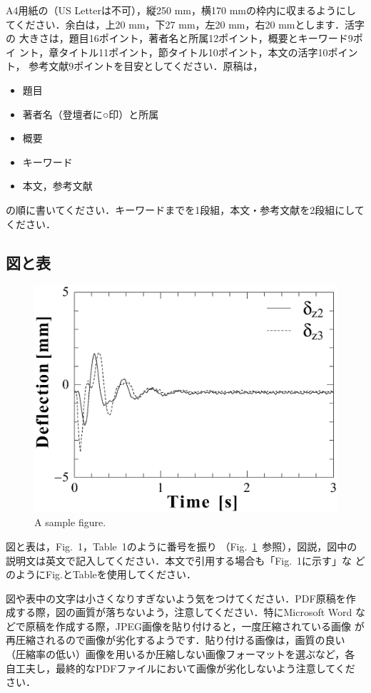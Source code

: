 \documentclass{jarticle}
\begin{document}
A4用紙の（US Letterは不可），縦250 mm，横170 mmの枠内に収まるようにし
てください．余白は，上20 mm，下27 mm，左20 mm，右20 mmとします．活字の
大きさは，題目16ポイント，著者名と所属12ポイント，概要とキーワード9ポイ
ント，章タイトル11ポイント，節タイトル10ポイント，本文の活字10ポイント，
参考文献9ポイントを目安としてください．原稿は，
%
\begin{itemize}
  \setlength{\topsep}{0pt}
  \setlength{\partopsep}{0pt}
  \setlength{\itemsep}{0pt}
  \setlength{\parsep}{0pt}
  \setlength{\parskip}{1pt plus 1pt minus 1pt}
  \item 題目
  \item 著者名（登壇者に○印）と所属
  \item 概要
  \item キーワード
  \item 本文，参考文献
\end{itemize}
%
の順に書いてください．キーワードまでを1段組，本文・参考文献を2段組にしてください． 

\subsection{図と表}

\begin{figure}[t]
  \centering
\ifLaTeXe
  \includegraphics[width=0.5\linewidth]{fig1}
\else
\fi
  \caption{A sample figure.}
  \label{fig:samplefig}
\end{figure}

図と表は，Fig.~1，Table~1のように番号を振り
（Fig.~\ref{fig:samplefig}\ 参照），図説，図中の
説明文は英文で記入してください．本文で引用する場合も「Fig.~1に示す」な
どのようにFig.とTableを使用してください．

図や表中の文字は小さくなりすぎないよう気をつけてください．PDF原稿を作
成する際，図の画質が落ちないよう，注意してください．特にMicrosoft Word
などで原稿を作成する際，JPEG画像を貼り付けると，一度圧縮されている画像
が再圧縮されるので画像が劣化するようです．貼り付ける画像は，画質の良い
（圧縮率の低い）画像を用いるか圧縮しない画像フォーマットを選ぶなど，各
自工夫し，最終的なPDFファイルにおいて画像が劣化しないよう注意してくだ
さい．
\end{document}
